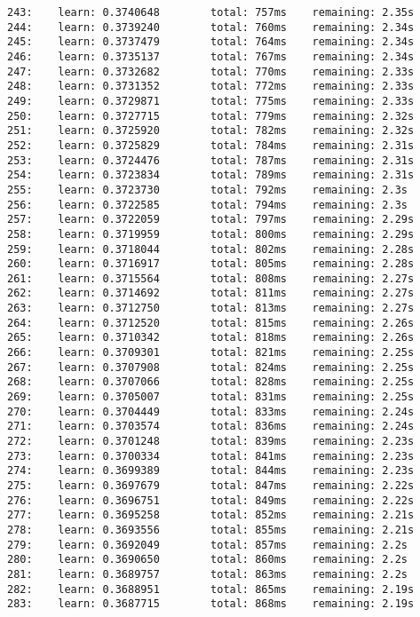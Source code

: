 \documentclass[11pt]{article}
\begin{document}
\begin{Verbatim}[commandchars=\\\{\}]
243:    learn: 0.3740648        total: 757ms    remaining: 2.35s
244:    learn: 0.3739240        total: 760ms    remaining: 2.34s
245:    learn: 0.3737479        total: 764ms    remaining: 2.34s
246:    learn: 0.3735137        total: 767ms    remaining: 2.34s
247:    learn: 0.3732682        total: 770ms    remaining: 2.33s
248:    learn: 0.3731352        total: 772ms    remaining: 2.33s
249:    learn: 0.3729871        total: 775ms    remaining: 2.33s
250:    learn: 0.3727715        total: 779ms    remaining: 2.32s
251:    learn: 0.3725920        total: 782ms    remaining: 2.32s
252:    learn: 0.3725829        total: 784ms    remaining: 2.31s
253:    learn: 0.3724476        total: 787ms    remaining: 2.31s
254:    learn: 0.3723834        total: 789ms    remaining: 2.31s
255:    learn: 0.3723730        total: 792ms    remaining: 2.3s
256:    learn: 0.3722585        total: 794ms    remaining: 2.3s
257:    learn: 0.3722059        total: 797ms    remaining: 2.29s
258:    learn: 0.3719959        total: 800ms    remaining: 2.29s
259:    learn: 0.3718044        total: 802ms    remaining: 2.28s
260:    learn: 0.3716917        total: 805ms    remaining: 2.28s
261:    learn: 0.3715564        total: 808ms    remaining: 2.27s
262:    learn: 0.3714692        total: 811ms    remaining: 2.27s
263:    learn: 0.3712750        total: 813ms    remaining: 2.27s
264:    learn: 0.3712520        total: 815ms    remaining: 2.26s
265:    learn: 0.3710342        total: 818ms    remaining: 2.26s
266:    learn: 0.3709301        total: 821ms    remaining: 2.25s
267:    learn: 0.3707908        total: 824ms    remaining: 2.25s
268:    learn: 0.3707066        total: 828ms    remaining: 2.25s
269:    learn: 0.3705007        total: 831ms    remaining: 2.25s
270:    learn: 0.3704449        total: 833ms    remaining: 2.24s
271:    learn: 0.3703574        total: 836ms    remaining: 2.24s
272:    learn: 0.3701248        total: 839ms    remaining: 2.23s
273:    learn: 0.3700334        total: 841ms    remaining: 2.23s
274:    learn: 0.3699389        total: 844ms    remaining: 2.23s
275:    learn: 0.3697679        total: 847ms    remaining: 2.22s
276:    learn: 0.3696751        total: 849ms    remaining: 2.22s
277:    learn: 0.3695258        total: 852ms    remaining: 2.21s
278:    learn: 0.3693556        total: 855ms    remaining: 2.21s
279:    learn: 0.3692049        total: 857ms    remaining: 2.2s
280:    learn: 0.3690650        total: 860ms    remaining: 2.2s
281:    learn: 0.3689757        total: 863ms    remaining: 2.2s
282:    learn: 0.3688951        total: 865ms    remaining: 2.19s
283:    learn: 0.3687715        total: 868ms    remaining: 2.19s

\end{Verbatim}
\end{document}

